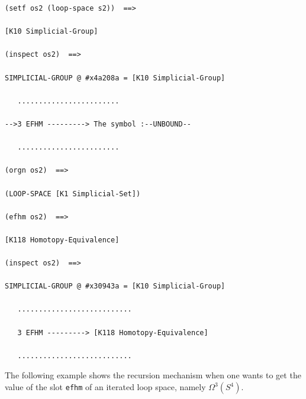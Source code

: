 {\footnotesize\begin{verbatim}
(setf os2 (loop-space s2))  ==>

[K10 Simplicial-Group]

(inspect os2)  ==>

SIMPLICIAL-GROUP @ #x4a208a = [K10 Simplicial-Group]

   ........................

-->3 EFHM ---------> The symbol :--UNBOUND--

   ........................

(orgn os2)  ==>

(LOOP-SPACE [K1 Simplicial-Set])

(efhm os2)  ==>

[K118 Homotopy-Equivalence]

(inspect os2)  ==>

SIMPLICIAL-GROUP @ #x30943a = [K10 Simplicial-Group]

   ...........................

   3 EFHM ---------> [K118 Homotopy-Equivalence]

   ...........................
\end{verbatim}}
The following example shows the recursion mechanism when one wants to get the value
of the slot {\tt efhm} of an iterated loop space, namely $\Omega^3(S^4)$.
